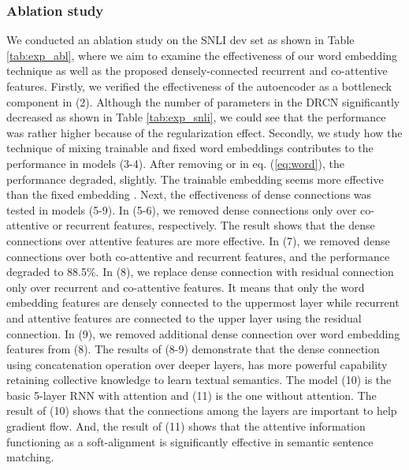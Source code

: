 \documentclass[letterpaper]{article} \usepackage{aaai19}  \usepackage{times}  \usepackage{helvet}  \usepackage{courier}  \usepackage{url}  \usepackage{graphicx}  \frenchspacing  \setlength{\pdfpagewidth}{8.5in}  \setlength{\pdfpageheight}{11in}
\begin{document}
\subsubsection{Ablation study}

We conducted an ablation study on the SNLI dev set as shown in Table \ref{tab:exp_abl}, where we aim to examine the effectiveness of our word embedding technique as well as the proposed densely-connected recurrent and co-attentive features. Firstly, we verified the effectiveness of the autoencoder as a bottleneck component in (2). 
Although the number of parameters in the DRCN significantly decreased as shown in Table \ref{tab:exp_snli}, we could see that the performance was rather higher because of the regularization effect. Secondly, we study how 
the technique of mixing trainable and fixed word embeddings
contributes to the performance in models (3-4). After removing  or  in eq. (\ref{eq:word}), the performance degraded, slightly. 
The trainable embedding  seems more effective than the fixed embedding .
Next, the effectiveness of dense connections was tested in models (5-9). In (5-6), we removed dense connections only over co-attentive or recurrent features, respectively. The result shows that the dense connections over attentive features are more effective. In (7), we removed dense connections over both co-attentive and recurrent features, and the performance degraded to 88.5\%. In (8), we replace dense connection with residual connection only over recurrent and co-attentive features. It means that only the word embedding features are densely connected to the uppermost layer while recurrent and attentive features are connected to the upper layer using the residual connection. In (9), we removed additional dense connection over word embedding features from (8). The results of (8-9) demonstrate that the dense connection using concatenation operation over deeper layers, has more powerful capability retaining collective knowledge to learn textual semantics. The model (10) is the basic 5-layer RNN with attention and (11) is the one without attention. The result of (10) shows that the connections among the layers are important to help gradient flow. And, the result of (11) shows that the attentive information functioning as a soft-alignment is significantly effective in semantic sentence matching.
\end{document}
